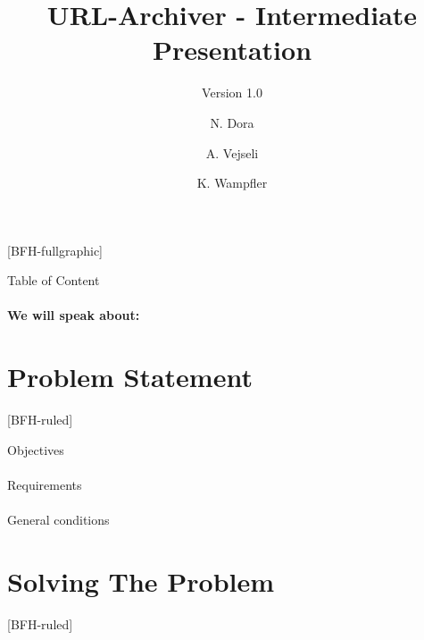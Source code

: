 \documentclass[
    ngerman,%
    authorontitle=true,
]{bfhbeamer}
\title{URL-Archiver - Intermediate Presentation}
\subtitle{Version 1.0}
\author[N. Dora \and A. Vejseli \and K. Wampfler]{N. Dora \and A. Vejseli \and K. Wampfler}
\institute{School of Engineering and Computer Science}
\begin{document}

    [BFH-fullgraphic]
    \maketitle



    \begin{frame}{Table of Content}
        \framesubtitle{We will speak about:}
        \tableofcontents
    \end{frame}

    \section{Problem Statement}
    [BFH-ruled]
    \frame{\sectionpage}

    \begin{frame}{Objectives}
        \framesubtitle{}
    \end{frame}

    \begin{frame}{Requirements}
        \framesubtitle{}

    \end{frame}

    \begin{frame}{General conditions}
        \framesubtitle{}
    \end{frame}

    \section{Solving The Problem}
    [BFH-ruled]
    \frame{\sectionpage}
\end{document}
